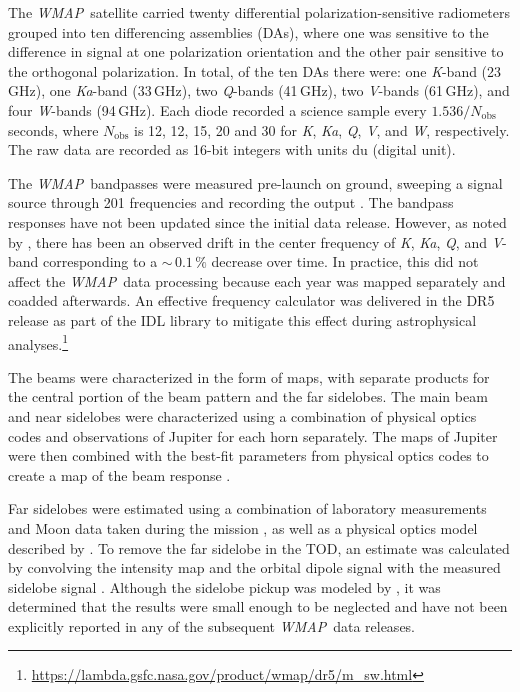 \documentclass[twocolumn]{../../common/aa}
\def\WMAP{\emph{WMAP}}
\newcommand{\K}[0]{\textit K}
\newcommand{\Ka}[0]{\textit{Ka}}
\newcommand{\Q}[0]{\textit Q}
\newcommand{\V}[0]{\textit V}
\newcommand{\W}[0]{\textit W}
\begin{document}
The \WMAP\ satellite carried twenty differential polarization-sensitive
radiometers grouped into ten differencing assemblies (DAs), where one 
was sensitive to the difference in signal at one polarization
orientation and the other pair sensitive to the orthogonal
polarization. In total, of the ten DAs there were:
one \K-band (23\,GHz), one \Ka-band (33\,GHz), two \Q-bands (41\,GHz),
two \V-bands (61\,GHz), and four \W-bands (94\,GHz). Each diode recorded a science sample every $1.536/N_\mathrm{obs}$ seconds, where $N_\mathrm{obs}$ is 12, 12, 15, 20 and 30 for \K, \Ka, \Q, \V, and \W, respectively. The raw data are recorded as 16-bit integers with units du (digital unit).

The \WMAP\ bandpasses were measured pre-launch on ground, sweeping a signal source through 201 frequencies and recording the output \citep{jarosik2003:MAP}. The bandpass responses have not been updated since the initial data release. However, as noted by \citet{bennett2012}, there has been an observed drift in the center frequency of \K, \Ka, \Q, and \V-band corresponding to a $\sim$$\,0.1\,\%$ decrease over time. In practice, this did not affect the \WMAP\ data processing because each year was mapped separately and coadded afterwards. An effective frequency calculator was delivered in the DR5 release as part of the IDL library to mitigate this effect during astrophysical analyses.\footnote{\url{https://lambda.gsfc.nasa.gov/product/wmap/dr5/m_sw.html}}

The beams were characterized in the form of maps, with separate products for the central portion of the beam pattern and the far sidelobes. The main beam and near sidelobes were characterized using a combination of physical optics codes and observations of Jupiter for each horn separately. The maps of Jupiter were then combined with the best-fit parameters from physical optics codes to create a map of the beam response \citep{hill2009,weiland2010,bennett2012}.

Far sidelobes were estimated using a combination of laboratory measurements and Moon data taken during the mission \citep{barnes2003}, as well as a physical optics model described by \citet{hinshaw2009}. To remove the far sidelobe  in the TOD, an estimate was calculated by convolving the intensity map and the orbital dipole signal with the measured sidelobe signal \citep{jarosik2007}. Although the sidelobe pickup was modeled by \citet{barnes2003}, it was determined that the results were small enough to be neglected and have not been explicitly reported in any of the subsequent \WMAP\ data releases.
\end{document}
